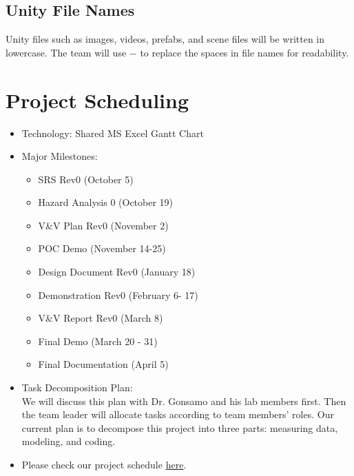 \documentclass{article}
\begin{document}
\subsection{Unity File Names}
Unity files such as images, videos, prefabs, and scene files will be written in lowercase. The team will use $-$ to replace the spaces in file names for readability.   

\section{Project Scheduling}
\begin{itemize}
    \item Technology: Shared MS Excel Gantt Chart
    \item Major Milestones: 
    \begin{itemize}
        \item SRS Rev0 (October 5)
        \item Hazard Analysis 0 (October 19)
        \item V\&V Plan Rev0 (November 2)
        \item POC Demo (November 14-25)
        \item Design Document Rev0 (January 18)
        \item Demonstration Rev0 (February 6- 17)
        \item V\&V Report Rev0  (March 8)
        \item Final Demo (March 20 - 31)
        \item Final Documentation (April 5)
    \end{itemize}
    \item Task Decomposition Plan:\\ We will discuss this plan with Dr. Gonsamo and his lab
    members first. Then the team leader will allocate tasks according to team members' roles. 
    Our current plan is to decompose this project into three parts: measuring data, modeling, and coding.
    \item Please check our project schedule \href{https://github.com/wuj187/DigitalTwinCAS/tree/main/docs/DevelopmentPlan/Project_Schedule}{here}.
\end{itemize}
\end{document}

